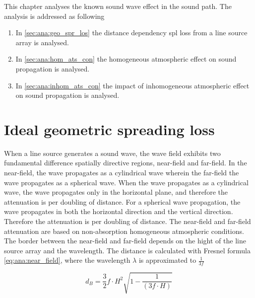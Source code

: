 
This chapter analyses the known sound wave effect in the sound path. The analysis is addressed as following  

\begin{enumerate}
\item In \autoref{sec:ana:geo_spr_los} the distance dependency \gls{spl} loss from a line source array is analysed. 
\item In \autoref{sec:ana:hom_ats_con} the homogeneous atmospheric effect on sound propagation is analysed.
\item In  \autoref{sec:ana:inhom_ats_con} the  impact of  inhomogeneous atmospheric effect on sound propagation is analysed.
\end{enumerate}



\section{Ideal geometric spreading loss}\label{sec:ana:geo_spr_los}
When a line source generates a sound wave, the wave field exhibits two fundamental difference spatially directive regions, near-field and far-field. In the near-field, the wave propagates as a cylindrical wave wherein the far-field the wave propagates as a spherical wave. When the wave propagates as a cylindrical wave, the wave propagates only in the horizontal plane, and therefore the attenuation is  per doubling of distance. For a spherical wave propagation, the wave propagates in both the horizontal direction and the vertical direction. Therefore the attenuation is  per doubling of distance. The near-field and far-field attenuation are based on non-absorption homogeneous atmospheric conditions. The border between the near-field and far-field depends on the hight of the line source array and the wavelength. The distance is calculated with Fresnel formula \autoref{eq:ana:near_field}, where the wavelength $\lambda$ is approximated to $\frac{1}{3f}$ \citep{bauman2001wavefront}

\begin{equation}\label{eq:ana:near_field}
d_{B} = \frac{3}{2}f \cdot H^{2}\sqrt{1-\frac{1}{(3f \cdot H)}}
\end{equation}

\startexplain
{}
\stopexplain

